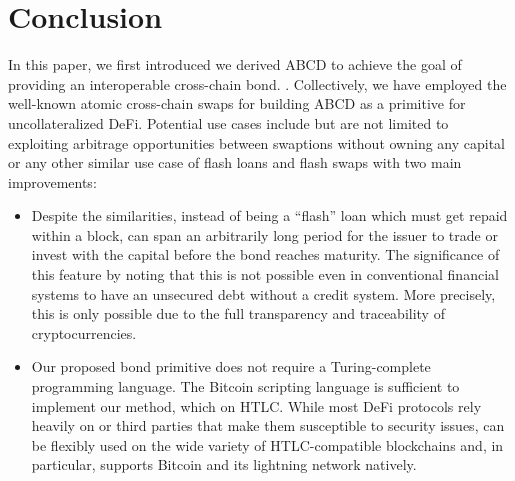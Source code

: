 \section{Conclusion}

In this paper, we first introduced   we derived ABCD to achieve the goal of providing an interoperable cross-chain bond.  .
Collectively, we have employed the well-known atomic cross-chain swaps for building ABCD as a primitive for uncollateralized DeFi. Potential use cases include but are not limited to exploiting arbitrage opportunities between swaptions without owning any capital or any other similar use case of flash loans and flash swaps with two main improvements: 
\begin{itemize}
    \item Despite the similarities, instead of being a ``flash'' loan which must get repaid within a block, \abcd can span an arbitrarily long period for the issuer to trade or invest with the capital before the bond reaches maturity. The significance of this feature  by noting that this is not possible even in conventional financial systems to have an unsecured debt without a credit system. More precisely, this is only possible due to the full transparency and traceability of cryptocurrencies.
    \item Our proposed bond primitive does not require a Turing-complete programming language. The Bitcoin scripting language is sufficient to implement our method, which  on HTLC. While most DeFi protocols rely heavily on  or third parties that make them susceptible to security issues, \abcd can be flexibly used on the wide variety of HTLC-compatible blockchains and, in particular, supports Bitcoin and its lightning network natively.
\end{itemize}
